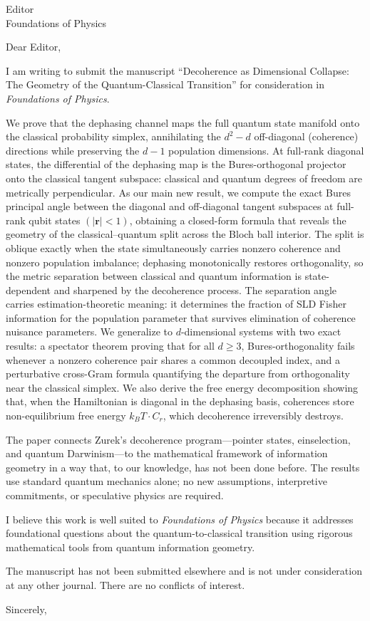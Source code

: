 \documentclass[12pt,a4paper]{letter}
\begin{document}
\begin{letter}{Editor\\Foundations of Physics}

\opening{Dear Editor,}

I am writing to submit the manuscript ``Decoherence as Dimensional Collapse: The Geometry of the Quantum-Classical Transition'' for consideration in \textit{Foundations of Physics}.

We prove that the dephasing channel maps the full quantum state manifold onto the classical probability simplex, annihilating the $d^2 - d$ off-diagonal (coherence) directions while preserving the $d - 1$ population dimensions. At full-rank diagonal states, the differential of the dephasing map is the Bures-orthogonal projector onto the classical tangent subspace: classical and quantum degrees of freedom are metrically perpendicular. As our main new result, we compute the exact Bures principal angle between the diagonal and off-diagonal tangent subspaces at full-rank qubit states $(|\mathbf{r}| < 1)$, obtaining a closed-form formula that reveals the geometry of the classical--quantum split across the Bloch ball interior. The split is oblique exactly when the state simultaneously carries nonzero coherence and nonzero population imbalance; dephasing monotonically restores orthogonality, so the metric separation between classical and quantum information is state-dependent and sharpened by the decoherence process. The separation angle carries estimation-theoretic meaning: it determines the fraction of SLD Fisher information for the population parameter that survives elimination of coherence nuisance parameters. We generalize to $d$-dimensional systems with two exact results: a spectator theorem proving that for all $d \geq 3$, Bures-orthogonality fails whenever a nonzero coherence pair shares a common decoupled index, and a perturbative cross-Gram formula quantifying the departure from orthogonality near the classical simplex. We also derive the free energy decomposition showing that, when the Hamiltonian is diagonal in the dephasing basis, coherences store non-equilibrium free energy $k_BT \cdot C_r$, which decoherence irreversibly destroys.

The paper connects Zurek's decoherence program---pointer states, einselection, and quantum Darwinism---to the mathematical framework of information geometry in a way that, to our knowledge, has not been done before. The results use standard quantum mechanics alone; no new assumptions, interpretive commitments, or speculative physics are required.

I believe this work is well suited to \textit{Foundations of Physics} because it addresses foundational questions about the quantum-to-classical transition using rigorous mathematical tools from quantum information geometry.

The manuscript has not been submitted elsewhere and is not under consideration at any other journal. There are no conflicts of interest.

\closing{Sincerely,}

\end{letter}
\end{document}
